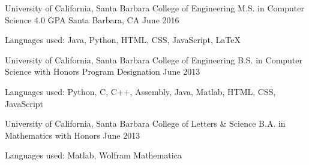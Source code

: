 \begin{cventries}
  \cventry
    {University of California, Santa Barbara \newline College of Engineering}
    {M.S. in Computer Science\newline\vspace{-1mm} {\scriptsize \textmd{4.0 GPA}}}
    {Santa Barbara, CA}
    {June 2016%
}
    {
    \begin{cvitems}
	\item {\scriptsize{Languages used: Java, Python, HTML, CSS, JavaScript,  \LaTeX}}
	\end{cvitems}
    }
\cventry
    {University of California, Santa Barbara \newline College of Engineering}
    {B.S. in Computer Science\newline\vspace{-1mm} {\scriptsize \textmd{with Honors Program Designation}}}
    {}
    {June 2013}{
    \begin{cvitems}
	\item {\scriptsize{Languages used: Python, C, C++, Assembly, Java, Matlab, HTML, CSS, JavaScript}}
	\end{cvitems}
}
\cventry
    {University of California, Santa Barbara \newline College of Letters \& Science}
    {B.A. in Mathematics \newline\vspace{-1mm} {\scriptsize \textmd{with Honors}}}
    {}
    {June 2013}
{
\begin{cvitems}
	\item {\scriptsize{Languages used: Matlab, Wolfram Mathematica}}
	\end{cvitems}
}
	
\end{cventries}